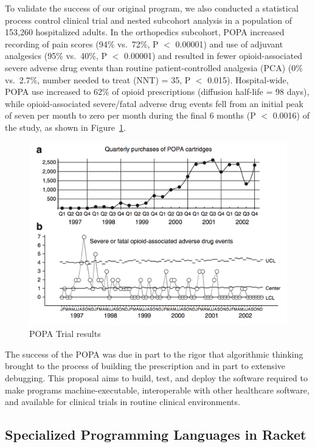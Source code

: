  
To validate the success of our original \poppl{} program, we also
conducted a statistical process control clinical trial and nested
subcohort analysis in a population of 153,260 hospitalized adults. In
the orthopedics subcohort, POPA increased recording of pain scores
(94\% vs.\ 72\%, P $<$ 0.00001) and use of adjuvant analgesics (95\%
vs.\ 40\%, P $<$ 0.00001) and resulted in fewer opioid-associated
severe adverse drug events than routine patient-controlled analgesia
(PCA) (0\% vs.\ 2.7\%, number needed to treat (NNT) = 35, P $<$
0.015). Hospital-wide, POPA use increased to 62\% of opioid
prescriptions (diffusion half-life = 98 days), while opioid-associated
severe/fatal adverse drug events fell from an initial peak of seven
per month to zero per month during the final 6 months (P $<$ 0.0016)
of the study, as shown in Figure~\ref{fig:popa-results}.

\begin{figure}
\begin{center}
\includegraphics[scale=.2]{popa.png}
\end{center}
\caption{POPA Trial results}\label{fig:popa-results}
\end{figure}

The success of the POPA was due in part to the rigor that algorithmic
thinking brought to the process of building the prescription and in
part to extensive debugging. This proposal aims to build, test, and
deploy the software required to make \poppl{} programs
machine-executable, interoperable with other healthcare software, and
available for clinical trials in routine clinical environments.

\subsection{Specialized Programming Languages in Racket}\label{sec:racket}

